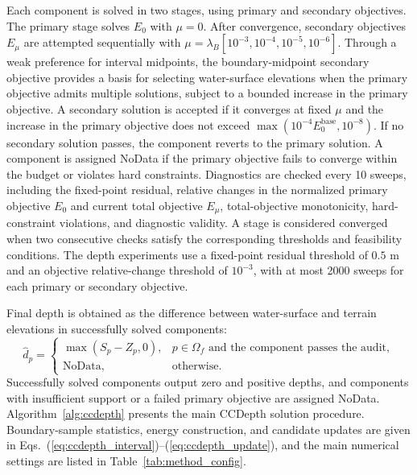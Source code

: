 \documentclass[authoryear,preprint,12pt]{elsarticle}
\begin{document}
Each component is solved in two stages, using primary and secondary objectives. The primary stage solves \(E_0\) with \(\mu=0\). After convergence, secondary objectives \(E_\mu\) are attempted sequentially with \(\mu=\lambda_B[10^{-3},10^{-4},10^{-5},10^{-6}]\). Through a weak preference for interval midpoints, the boundary-midpoint secondary objective provides a basis for selecting water-surface elevations when the primary objective admits multiple solutions, subject to a bounded increase in the primary objective. A secondary solution is accepted if it converges at fixed \(\mu\) and the increase in the primary objective does not exceed \(\max(10^{-4}E_0^{\mathrm{base}},10^{-8})\). If no secondary solution passes, the component reverts to the primary solution. A component is assigned NoData if the primary objective fails to converge within the budget or violates hard constraints. Diagnostics are checked every 10 sweeps, including the fixed-point residual, relative changes in the normalized primary objective \(E_0\) and current total objective \(E_\mu\), total-objective monotonicity, hard-constraint violations, and diagnostic validity. A stage is considered converged when two consecutive checks satisfy the corresponding thresholds and feasibility conditions. The depth experiments use a fixed-point residual threshold of \(0.5\) m and an objective relative-change threshold of \(10^{-3}\), with at most 2000 sweeps for each primary or secondary objective.

Final depth is obtained as the difference between water-surface and terrain elevations in successfully solved components:
\begin{equation}\label{eq:ccdepth_depth}
 \hat d_p=
 \begin{cases}
  \max(S_p-Z_p,0), & p\in\Omega_f\text{ and the component passes the audit},\\
  \text{NoData}, & \text{otherwise}.
 \end{cases}
\end{equation}
Successfully solved components output zero and positive depths, and components with insufficient support or a failed primary objective are assigned NoData. Algorithm~\ref{alg:ccdepth} presents the main CCDepth solution procedure. Boundary-sample statistics, energy construction, and candidate updates are given in Eqs.~(\ref{eq:ccdepth_interval})--(\ref{eq:ccdepth_update}), and the main numerical settings are listed in Table~\ref{tab:method_config}.


\end{document}
